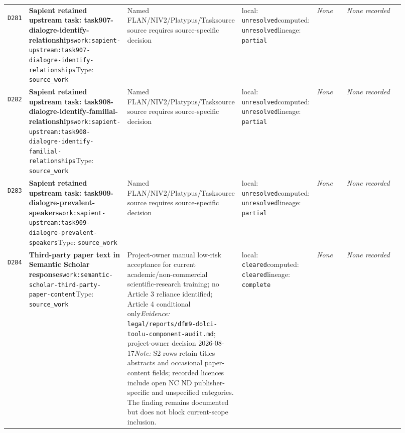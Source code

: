 \documentclass[9pt,a4paper]{article}
\newcommand{\depid}[1]{\hypertarget{dep:#1}{\texttt{#1}}}
\begin{document}
\begin{landscape}
\begin{longtable}{@{}L{0.035\linewidth}L{0.185\linewidth}L{0.27\linewidth}L{0.09\linewidth}L{0.10\linewidth}L{0.24\linewidth}@{}}
\depid{D281} & \textbf{Sapient retained upstream task: task907-dialogre-identify-relationships}\newline \nolinkurl{work:sapient-upstream:task907-dialogre-identify-relationships}\newline Type: \texttt{source\_work} & Named FLAN/NIV2/Platypus/Tasksource source requires source-specific decision & local: \texttt{unresolved}\newline computed: \texttt{unresolved}\newline lineage: \texttt{partial} & \textit{None} & \textit{None recorded} \\
\depid{D282} & \textbf{Sapient retained upstream task: task908-dialogre-identify-familial-relationships}\newline \nolinkurl{work:sapient-upstream:task908-dialogre-identify-familial-relationships}\newline Type: \texttt{source\_work} & Named FLAN/NIV2/Platypus/Tasksource source requires source-specific decision & local: \texttt{unresolved}\newline computed: \texttt{unresolved}\newline lineage: \texttt{partial} & \textit{None} & \textit{None recorded} \\
\depid{D283} & \textbf{Sapient retained upstream task: task909-dialogre-prevalent-speakers}\newline \nolinkurl{work:sapient-upstream:task909-dialogre-prevalent-speakers}\newline Type: \texttt{source\_work} & Named FLAN/NIV2/Platypus/Tasksource source requires source-specific decision & local: \texttt{unresolved}\newline computed: \texttt{unresolved}\newline lineage: \texttt{partial} & \textit{None} & \textit{None recorded} \\
\depid{D284} & \textbf{Third-party paper text in Semantic Scholar responses}\newline \nolinkurl{work:semantic-scholar-third-party-paper-content}\newline Type: \texttt{source\_work} & Project-owner manual low-risk acceptance for current academic/non-commercial scientific-research training; no Article 3 reliance identified; Article 4 conditional only\newline \textit{Evidence:} \nolinkurl{legal/reports/dfm9-dolci-toolu-component-audit.md}; project-owner decision 2026-08-17\newline \textit{Note:} S2 rows retain titles abstracts and occasional paper-content fields; recorded licences include open NC ND publisher-specific and unspecified categories. The finding remains documented but does not block current-scope inclusion. & local: \texttt{cleared}\newline computed: \texttt{cleared}\newline lineage: \texttt{complete} & \textit{None} & \textit{None recorded} \\

\end{longtable}
\end{landscape}
\end{document}
